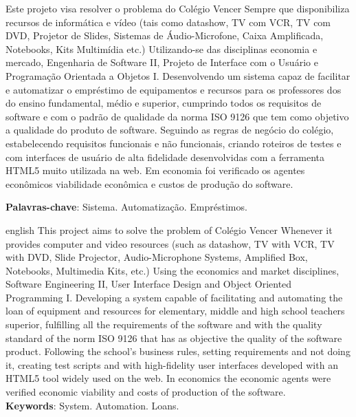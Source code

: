 \documentclass[
12pt,				%
oneside,			%
a4paper,			%
section=TITLE,
brazil,				%
]{abntex2}
\begin{document}
  \begin{resumo}

    Este projeto visa resolver o problema do Colégio Vencer Sempre que
    disponibiliza recursos de informática e vídeo  (tais como datashow, TV com VCR,
    TV com DVD, Projetor de Slides, Sistemas de Áudio-Microfone, Caixa Amplificada,
    Notebooks, Kits Multimídia etc.) Utilizando-se das disciplinas economia e
    mercado, Engenharia de Software II, Projeto de Interface com o Usuário e
    Programação Orientada a Objetos I. Desenvolvendo um sistema capaz de facilitar
    e automatizar o empréstimo de equipamentos  e recursos para os professores dos
    do ensino fundamental, médio e superior, cumprindo todos os requisitos de
    software e com o padrão de qualidade da norma ISO 9126 que tem como objetivo a
    qualidade do produto de software. Seguindo as regras de negócio do colégio,
    estabelecendo requisitos funcionais e não funcionais, criando roteiros de
    testes e com interfaces de usuário de alta fidelidade desenvolvidas com a
    ferramenta HTML5 muito utilizada na web. Em economia foi verificado os agentes
    econômicos viabilidade econômica e custos de produção do software.

    \textbf{Palavras-chave}: Sistema. Automatização. Empréstimos.
  \end{resumo}


  \begin{resumo}[Abstract]
    \begin{otherlanguage*}{english}
      This project aims to solve the problem of Colégio Vencer Whenever it
      provides computer and video resources (such as datashow, TV with VCR, TV
      with DVD, Slide Projector, Audio-Microphone Systems, Amplified Box,
      Notebooks, Multimedia Kits, etc.) Using the economics and market
      disciplines, Software Engineering II, User Interface Design and Object
      Oriented Programming I. Developing a system capable of facilitating and
      automating the loan of equipment and resources for elementary, middle and
      high school teachers superior, fulfilling all the requirements of the
      software and with the quality standard of the norm ISO 9126 that has as
      objective the quality of the software product. Following the school's
      business rules, setting requirements and not doing it, creating test scripts
      and with high-fidelity user interfaces developed with an HTML5 tool widely
      used on the web. In economics the economic agents were verified economic
      viability and costs of production of the software.
      \\
      \vspace{\onelineskip}
      \noindent
      \textbf{Keywords}: System. Automation. Loans.
    \end{otherlanguage*}
  \end{resumo}
\end{document}
